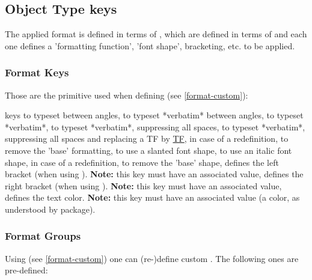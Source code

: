 \documentclass{article}
\begin{document}
\subsection{Object Type keys}\label{obj-type-def}

The applied format is defined in terms of , which are defined in terms of  and each one defines a 'formatting function', 'font shape', bracketing, etc. to be applied.

\subsubsection{Format Keys}\label{format-keys}
Those are the primitive  used when defining   (see \ref{format-custom}):

\begin{describelist*}{keys}
   { to typeset between angles,}
   { to typeset *verbatim* between angles,}
   { to typeset *verbatim*,}
   { to typeset *verbatim*, suppressing all spaces,}
   { to typeset *verbatim*, suppressing all spaces and replacing a TF by \underline{TF},}
   { in case of a redefinition, to remove the 'base' formatting,}
   { to use a slanted font shape,}
   { to use an italic font shape,}
   { in case of a redefinition, to remove the 'base' shape,}
    { defines the left bracket (when using \tsobj{\tsargs}). \textbf{Note:} this key must have an associated value,}
    { defines the right bracket (when using \tsobj{\tsargs}). \textbf{Note:} this key must have an associated value,}
     { defines the text color. \textbf{Note:} this key must have an associated value (a color, as understood by  package).}
\end{describelist*}

\subsubsection{Format Groups}\label{format-group}
Using  (see \ref{format-custom}) one can (re-)define custom . The following ones are pre-defined:
\end{document}
